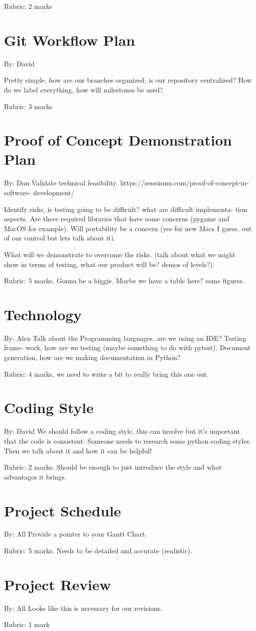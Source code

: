 \documentclass{article}
\begin{document}
Rubric:  2 marks

\section{Git Workflow Plan}
By: David

Pretty  simple,  how  are  our  branches  organized,  is  our  repository
centralized?
How do we label everything, how will milestones be used?

Rubric:  3 marks

\section{Proof of Concept Demonstration Plan}
By: Dan
Validate technical feasibility.
https://sensinum.com/proof-of-concept-in-software-
development/

Identify risks, is testing going to be difficult?  what are difficult
implementa-
tion aspects.  Are there required libraries that have some concerns (pygame and
MacOS for example).  Will portability be a concern (yes for new Macs I guess,
out  of our control but lets talk about it).

What will we demonstrate to overcome the risks.  (talk about what we might
show in terms of testing, what our product will be?  demos of levels?).

Rubric:  5  marks.   Gonna  be  a  biggie.   Maybe  we  have  a  table  here?
some figures.

\section{Technology}
By: Alex
Talk  about  the  Programming  languages,  are  we  using  an  IDE?  Testing
frame-
work,  how  are  we  testing  (maybe  something  to  do  with  pytest).
Document
generation, how are we making documentation in Python?

Rubric:  4 marks, we need to write a bit to really bring this one out.

\section{Coding Style}
By: David
We  should  follow  a  coding  style,  this  can  involve  but  it’s  important
 that  the
code is consistent.  Someone needs to research some python coding styles.  Then
we talk about it and how it can be helpful!

Rubric:  2  marks.   Should  be  enough  to  just  introduce  the  style  and
what
advantages it brings.

\section{Project Schedule}
By: All
Provide a pointer to your Gantt Chart.

Rubric:  5 marks.  Needs to be detailed and accurate (realistic).

\section{Project Review}
By: All
Looks like this is necessary for our revisions.

Rubric:  1 mark
\end{document}
